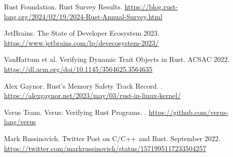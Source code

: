 \documentclass[11pt]{article}
\begin{document}
\begin{thebibliography}{99}
Rust Foundation.
 Rust Survey Results.
\newblock \url{https://blog.rust-lang.org/2024/02/19/2024-Rust-Annual-Survey.html}

JetBrains.
\newblock The State of Developer Ecosystem 2023.
\newblock \url{https://www.jetbrains.com/lp/devecosystem-2023/}

VanHattum et al.
\newblock Verifying Dynamic Trait Objects in Rust.
\newblock ACSAC 2022.
\newblock \url{https://dl.acm.org/doi/10.1145/3564625.3564635}

Alex Gaynor.
\newblock Rust's Memory Safety Track Record.
.
\newblock \url{https://alexgaynor.net/2023/may/03/rust-in-linux-kernel/}

Verus Team.
\newblock Verus: Verifying Rust Programs.
.
\newblock \url{https://github.com/verus-lang/verus}

Mark Russinovich.
\newblock Twitter Post on C/C++ and Rust.
\newblock September 2022.
\newblock \url{https://twitter.com/markrussinovich/status/1571995117233504257}

\end{thebibliography}
\end{document}
